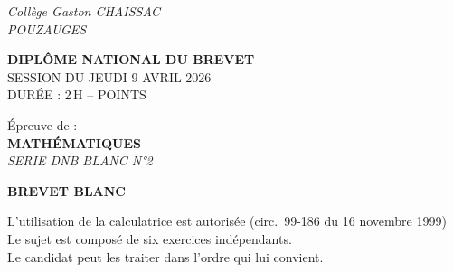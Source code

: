 \documentclass[a4paper,11pt]{article}
\begin{document}
\thispagestyle{fancy}


\begin{flushleft}
{\fontsize{12}{14}\selectfont\textit{Collège Gaston CHAISSAC}}\\[2pt]
{\fontsize{12}{14}\selectfont\textit{POUZAUGES}}
\end{flushleft}

\vspace{1.5cm}

\begin{center}
  {\LARGE\bfseries DIPLÔME NATIONAL DU BREVET}\\[0.6cm]
  {\large SESSION DU JEUDI 9 AVRIL 2026}\\[0.3cm]
  {\large DURÉE : 2\,H \;-- POINTS}
\end{center}

\vspace{1cm}

\begin{center}
\begin{tcolorbox}[
  width=12cm,
  colback=gray!25,
  colframe=gray!25,
  arc=4pt,
  boxrule=0pt,
  halign=center,
  top=10pt, bottom=10pt
]
  {\normalsize Épreuve de :}\\[0.5cm]
  {\Large\bfseries MATHÉMATIQUES}\\[0.4cm]
  {\large\itshape SERIE DNB BLANC N°2}\\[0.5cm]
  \begin{tcolorbox}[
    width=7cm,
    colback=white,
    colframe=black,
    arc=3pt,
    boxrule=0.5pt,
    halign=center,
    top=4pt, bottom=4pt
  ]
    {\normalsize\bfseries BREVET BLANC}
  \end{tcolorbox}
\end{tcolorbox}
\end{center}

\vspace{1cm}

\begin{center}
  L'utilisation de la calculatrice est autorisée (circ.\ 99-186 du 16 novembre 1999)\\[0.3cm]
  Le sujet est composé de six exercices indépendants.\\[0.15cm]
  Le candidat peut les traiter dans l'ordre qui lui convient.
\end{center}
\end{document}
